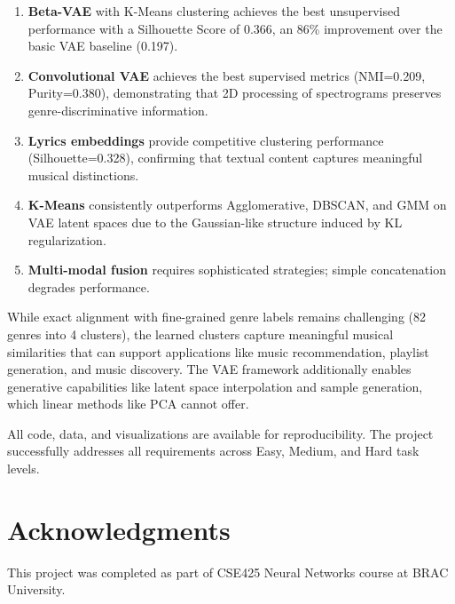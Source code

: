 \documentclass{article}
\begin{document}
\begin{enumerate}
    \item \textbf{Beta-VAE} with K-Means clustering achieves the best unsupervised performance with a Silhouette Score of 0.366, an 86\% improvement over the basic VAE baseline (0.197).
    
    \item \textbf{Convolutional VAE} achieves the best supervised metrics (NMI=0.209, Purity=0.380), demonstrating that 2D processing of spectrograms preserves genre-discriminative information.
    
    \item \textbf{Lyrics embeddings} provide competitive clustering performance (Silhouette=0.328), confirming that textual content captures meaningful musical distinctions.
    
    \item \textbf{K-Means} consistently outperforms Agglomerative, DBSCAN, and GMM on VAE latent spaces due to the Gaussian-like structure induced by KL regularization.
    
    \item \textbf{Multi-modal fusion} requires sophisticated strategies; simple concatenation degrades performance.
\end{enumerate}

While exact alignment with fine-grained genre labels remains challenging (82 genres into 4 clusters), the learned clusters capture meaningful musical similarities that can support applications like music recommendation, playlist generation, and music discovery. The VAE framework additionally enables generative capabilities like latent space interpolation and sample generation, which linear methods like PCA cannot offer.

All code, data, and visualizations are available for reproducibility. The project successfully addresses all requirements across Easy, Medium, and Hard task levels.

\section*{Acknowledgments}
This project was completed as part of CSE425 Neural Networks course at BRAC University.
\end{document}
